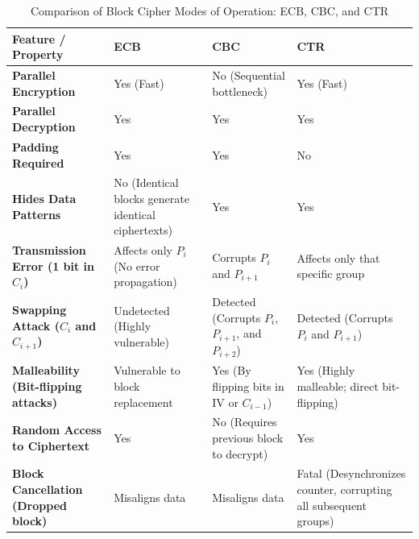 \begin{table}[h]
    \centering
    \begin{tabular}{|>{\raggedright\arraybackslash}p{3.5cm}|>{\raggedright\arraybackslash}p{3.5cm}|>{\raggedright\arraybackslash}p{3.5cm}|>{\raggedright\arraybackslash}p{3.5cm}|}
        \hline
        \textbf{Feature / Property} & \textbf{ECB} & \textbf{CBC} & \textbf{CTR} \\
        \hline
        \textbf{Parallel Encryption} & Yes (Fast) & No (Sequential bottleneck) & Yes (Fast) \\
        \hline
        \textbf{Parallel Decryption} & Yes & Yes & Yes \\
        \hline
        \textbf{Padding Required} & Yes & Yes & No \\
        \hline
        \textbf{Hides Data Patterns} & No (Identical blocks generate identical ciphertexts) & Yes & Yes \\
        \hline
        \textbf{Transmission Error (1 bit in $C_i$)} & Affects only $P_i$ (No error propagation) & Corrupts $P_i$ and $P_{i+1}$ & Affects only that specific group \\
        \hline
        \textbf{Swapping Attack ($C_i$ and $C_{i+1}$)} & Undetected (Highly vulnerable) & Detected (Corrupts $P_i$, $P_{i+1}$, and $P_{i+2}$) & Detected (Corrupts $P_i$ and $P_{i+1}$) \\
        \hline
        \textbf{Malleability \newline (Bit-flipping attacks)} & Vulnerable to block replacement & Yes (By flipping bits in IV or $C_{i-1}$) & Yes (Highly malleable; direct bit-flipping) \\
        \hline
        \textbf{Random Access to Ciphertext} & Yes & No (Requires previous block to decrypt) & Yes \\
        \hline
        \textbf{Block Cancellation \newline (Dropped block)} & Misaligns data & Misaligns data & Fatal (Desynchronizes counter, corrupting all subsequent groups) \\
        \hline
    \end{tabular}
    \vspace{0.2cm}
    \caption{Comparison of Block Cipher Modes of Operation: ECB, CBC, and CTR}
    \label{tab:modes_comparison}
\end{table}

